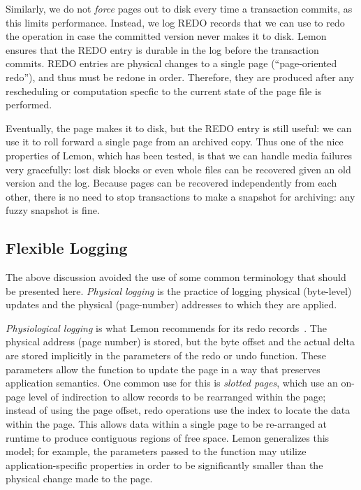 \documentclass[letterpaper,twocolumn,english]{article}
\newcommand{\yad}{Lemon\xspace}
\begin{document}
Similarly, we do not {\em force} pages out to disk every time a transaction
commits, as this limits performance.  Instead, we log REDO records
that we can use to redo the operation in case the committed version never
makes it to disk.  \yad ensures that the REDO entry is durable in the
log before the transaction commits.  REDO entries are physical changes
to a single page (``page-oriented redo''), and thus must be redone in
order.  Therefore, they are produced after any rescheduling or computation
specfic to the current state of the page file is performed.

Eventually, the page makes it to disk, but the REDO entry is still
useful: we can use it to roll forward a single page from an archived
copy.  Thus one of the nice properties of \yad, which has been tested,
is that we can handle media failures very gracefully: lost disk blocks
or even whole files can be recovered given an old version and the log.
Because pages can be recovered independently from each other, there is
no need to stop transactions to make a snapshot for archiving: any
fuzzy snapshot is fine.

\subsection{Flexible Logging}
\label{flex-logging}

The above discussion avoided the use of some common terminology 
that should be presented here. {\em Physical logging } 
is the practice of logging physical (byte-level) updates
and the physical (page-number) addresses to which they are applied.

{\em Physiological logging } is what \yad recommends for its redo
records~\cite{physiological}. The physical address (page number) is
stored, but the byte offset and the actual delta are stored implicitly
in the parameters of the redo or undo function. These parameters allow
the function to update the page in a way that preserves application
semantics.  One common use for this is {\em slotted pages}, which use
an on-page level of indirection to allow records to be rearranged
within the page; instead of using the page offset, redo operations use
the index to locate the data within the page. This allows data within a single
page to be re-arranged at runtime to produce contiguous regions of
free space. \yad generalizes this model; for example, the parameters
passed to the function may utilize application-specific properties in
order to be significantly smaller than the physical change made to the
page.
\end{document}
